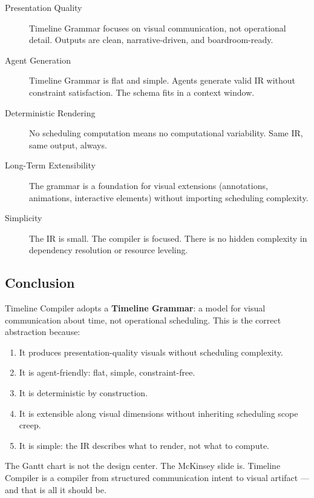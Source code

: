\begin{description}
  \item[Presentation Quality] Timeline Grammar focuses on visual communication, not operational detail. Outputs are clean, narrative-driven, and boardroom-ready.
  
  \item[Agent Generation] Timeline Grammar is flat and simple. Agents generate valid IR without constraint satisfaction. The schema fits in a context window.
  
  \item[Deterministic Rendering] No scheduling computation means no computational variability. Same IR, same output, always.
  
  \item[Long-Term Extensibility] The grammar is a foundation for visual extensions (annotations, animations, interactive elements) without importing scheduling complexity.
  
  \item[Simplicity] The IR is small. The compiler is focused. There is no hidden complexity in dependency resolution or resource leveling.
\end{description}

\subsection{Conclusion}

Timeline Compiler adopts a \textbf{Timeline Grammar}: a model for visual communication about time, not operational scheduling. This is the correct abstraction because:

\begin{enumerate}
  \item It produces presentation-quality visuals without scheduling complexity.
  \item It is agent-friendly: flat, simple, constraint-free.
  \item It is deterministic by construction.
  \item It is extensible along visual dimensions without inheriting scheduling scope creep.
  \item It is simple: the IR describes what to render, not what to compute.
\end{enumerate}

The Gantt chart is not the design center. The McKinsey slide is. Timeline Compiler is a compiler from structured communication intent to visual artifact — and that is all it should be.
